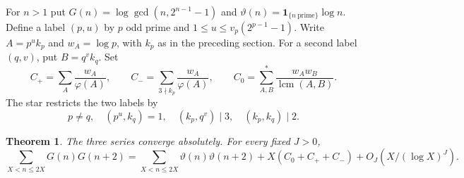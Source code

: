 \documentclass[11pt]{article}
\newtheorem{theorem}{Theorem}[section]
\begin{document}
For \(n>1\) put \(G(n)=\log\gcd(n,2^{n-1}-1)\) and
\(\vartheta(n)=\mathbf1_{\{n\ \mathrm{prime}\}}\log n\).
Define a label \((p,u)\) by \(p\) odd prime and
\(1\le u\le v_p(2^{p-1}-1)\). Write \(A=p^uk_p\) and
\(w_A=\log p\), with \(k_p\) as in the preceding section.
For a second label \((q,v)\), put \(B=q^v k_q\).
Set
\[
 C_+=\sum_A\frac{w_A}{\varphi(A)},\qquad
 C_-=\sum_{3\nmid k_p}\frac{w_A}{\varphi(A)},\qquad
 C_0=\sum_{A,B}^{*}\frac{w_Aw_B}{\operatorname{lcm}(A,B)} .
\]
The star restricts the two labels by
\[
 p\ne q,\quad (p^u,k_q)=1,\quad(k_p,q^v)\mid3,\quad(k_p,k_q)\mid2.
\]
\begin{theorem}\label{thm:gcdmoment}
The three series converge absolutely. For every fixed \(J>0\),
\[
 \sum_{X<n\le2X}G(n)G(n+2)
 =
 \sum_{X<n\le2X}\vartheta(n)\vartheta(n+2)
 + X(C_0+C_++C_-)+O_J(X/(\log X)^J).
\]
\end{theorem}
\end{document}
